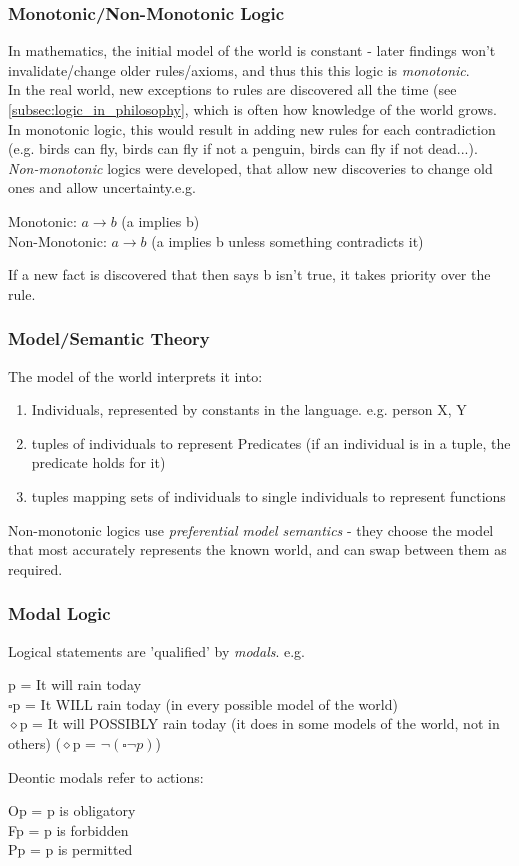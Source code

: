 \subsubsection{Monotonic/Non-Monotonic Logic}
In mathematics, the initial model of the world is constant - later findings won't invalidate/change older rules/axioms, and thus this this logic is \emph{monotonic}.\\
In the real world, new exceptions to rules are discovered all the time (see \ref{subsec:logic_in_philosophy}, which is often how knowledge of the world grows. In monotonic logic, this would result in adding new rules for each contradiction (e.g. birds can fly, birds can fly if not a penguin, birds can fly if not dead...).\\
\emph{Non-monotonic} logics were developed, that allow new discoveries to change old ones and allow uncertainty.e.g.
\begin{center}
    Monotonic: $a\rightarrow b$ (a implies b)\\
    Non-Monotonic: $a\rightarrow b$ (a implies b unless something contradicts it)
\end{center}
If a new fact is discovered that then says b isn't true, it takes priority over the rule.

\subsubsection{Model/Semantic Theory}
The model of the world interprets it into:
\begin{enumerate}
    \item Individuals, represented by constants in the language. e.g. person X, Y
    \item tuples of individuals to represent Predicates (if an individual is in a tuple, the predicate holds for it)
    \item tuples mapping sets of individuals to single individuals to represent functions
\end{enumerate}
Non-monotonic logics use \emph{preferential model semantics} - they choose the model that most accurately represents the known world, and can swap between them as required.

\subsubsection{Modal Logic} \label{subsubsec:Modal_logic}
Logical statements are 'qualified' by \emph{modals}. e.g.
\begin{center}
    p = It will rain today\\
    $\square$p = It WILL rain today (in every possible model of the world)\\
    $\diamond$p = It will POSSIBLY rain today (it does in some models of the world, not in others) ($\diamond$p = $\neg(\square\neg p)$)
\end{center}
Deontic modals refer to actions:
\begin{center}
    Op = p is obligatory\\
    Fp = p is forbidden\\
    Pp = p is permitted
\end{center}

